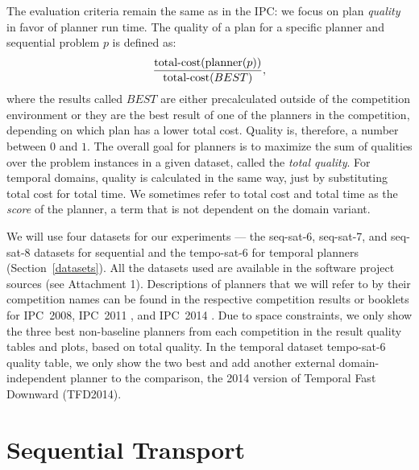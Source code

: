 The evaluation criteria remain the same as in the IPC:
we focus on plan \textit{quality} in favor of planner run time.
The quality of a plan for a specific planner and sequential problem $p$ is defined as:
$$\frac{\textrm{total-cost}(\textrm{planner}(p))}{\textrm{total-cost}(BEST)},$$
where the results called $BEST$
are either precalculated outside of the competition environment or they are the best result of one of the planners in the competition, depending on which plan has a lower total cost.
Quality is, therefore, a number between $0$ and $1$.
The overall goal for planners is to maximize the sum of qualities over the problem instances in a given dataset, called the \textit{total quality}.
For temporal domains, quality is calculated in the same way, just by substituting total cost
for total time. We sometimes refer to total cost and total time as the \textit{score} of the planner, a term that is not dependent on the domain variant.

We will use four datasets for our experiments --- the seq-sat-6, seq-sat-7,
and seq-sat-8 datasets for sequential
and the tempo-sat-6 for temporal planners (Section~\ref{datasets}).
All the datasets used are available in the
software project sources (see Attachment 1).
Descriptions of planners that we will refer to by their competition names can be found in the respective competition results or booklets for IPC~2008, IPC~2011 \citep{Garcia-Olaya2011}, and IPC~2014 \citep{Vallati2015}.
Due to space constraints, we only show the three
best non-baseline planners from each competition
in the result quality tables and plots, based on total quality.
In the temporal dataset tempo-sat-6 quality table, we only show the two best
and add another external domain-independent planner
to the comparison, the 2014 version of Temporal Fast Downward (TFD2014).






















\section{Sequential Transport}

